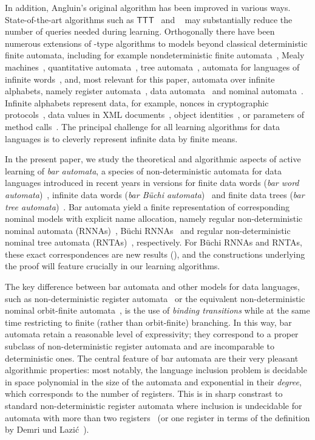 \documentclass[a4paper,UKenglish,cleveref,autoref,thm-restate,numberwithinsect,final]{lipics-v2021}
\begin{document}
In addition, Angluin's original \Lstar algorithm has been improved in various ways. State-of-the-art algorithms such as $\mathsf{TTT}$~\cite{ihs14} and \Lsharp~\cite{vgrw22} may substantially reduce the number of
queries needed during learning. Orthogonally there have been numerous extensions of \Lstar-type
algorithms to models beyond classical deterministic finite automata, including for example nondeterministic finite automata~\cite{bhkl09}, Mealy machines~\cite{MargariaNRS04}, quantitative automata~\cite{bm15,hkrs20},
tree automata~\cite{dh03,k13}, automata for languages of infinite
words~\cite{af16,MalerP95,fcctw08,lczl21}, and, most relevant for this paper, automata over infinite alphabets, namely register automata~\cite{DBLP:conf/tacas/DierlFHJST24,CasselHJS16,CEGAR12,BolligHLM13}, data automata~\cite{dhlt14} and nominal automata~\cite{mssks17,ms22}. Infinite alphabets represent data, for
example, nonces in cryptographic protocols~\cite{KurtzEA07}, data
values in XML documents~\cite{NevenEA04}, object
identities~\cite{GrigoreEA13}, or parameters of method
calls~\cite{HowarEA19}. The principal challenge for all learning algorithms for data languages is to cleverly represent infinite data by finite means.

In the present paper, we study the theoretical and algorithmic aspects of active learning of \emph{bar automata}, a species of non-deterministic automata for data languages introduced in recent years in versions for finite data words (\emph{bar word automata})~\cite{skmw17}, infinite data words (\emph{bar Büchi automata})~\cite{uhms21} and finite data trees (\emph{bar tree automata})~\cite{ps24}. Bar automata yield a finite representation of corresponding nominal models with explicit name allocation, namely regular non-deterministic nominal automata (RNNAs)~\cite{skmw17}, Büchi RNNAs~\cite{uhms21} and regular non-deterministic nominal tree automata (RNTAs)~\cite{uhms21}, respectively. For Büchi RNNAs and RNTAs, these exact correspondences are new results (), and the constructions underlying the proof will feature crucially in our learning algorithms.

The key difference between bar automata and other models for data languages, such as non-deterministic register automata~\cite{KaminskiFrancez94,KaminskiZeitlin10} or the equivalent non-deterministic nominal orbit-finite automata~\cite{BojanczykEA14}, is the use of \emph{binding transitions} while at the same time restricting to {finite} (rather than orbit-finite) branching. In this way, bar automata retain a reasonable level of expressivity; they correspond to a proper subclass of non-deterministic register automata and are incomparable to deterministic ones. The central feature of bar automata are their very pleasant algorithmic properties: most notably, the language inclusion problem is decidable in space
polynomial in the size of the automata and exponential in their \emph{degree}, which corresponds
to the number of registers. This is in sharp constrast to standard non-deterministic register automata where inclusion is undecidable for automata with more than two registers~\cite{KaminskiFrancez94} (or one register in terms of the definition by Demri und Lazi\'c~\cite{DemriLazic09}). 
\end{document}
